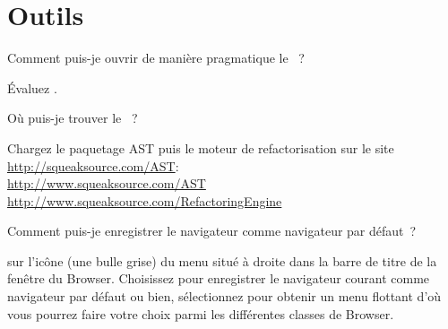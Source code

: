 \documentclass[a4paper,10pt,twoside]{book}
\begin{document}
\section{Outils}

\begin{faq}
Comment puis-je ouvrir de manière pragmatique le  ~?
\end{faq}
\answer
Évaluez .

\begin{faq}
Où puis-je trouver le ~?
\end{faq}
\answer
Chargez le paquetage AST puis le moteur de 
refactorisation sur le site \url{http://squeaksource.com/AST}:\\
\url{http://www.squeaksource.com/AST}\\
\url{http://www.squeaksource.com/RefactoringEngine} %

\begin{faq}
Comment puis-je enregistrer le navigateur comme navigateur par défaut~?
\end{faq}
\answer
\Clickz{} sur l'icône (une bulle grise) du menu situé à droite dans la barre de
titre de la fenêtre du Browser. %
Choisissez  pour enregistrer le navigateur courant comme navigateur par défaut ou bien, sélectionnez  pour obtenir un menu flottant d'où vous pourrez faire votre choix parmi les différentes classes de Browser.

\end{document}

